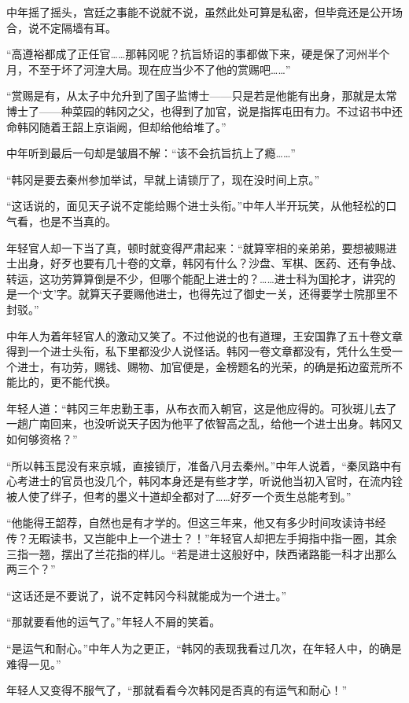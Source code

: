 中年摇了摇头，宫廷之事能不说就不说，虽然此处可算是私密，但毕竟还是公开场合，说不定隔墙有耳。

“高遵裕都成了正任官……那韩冈呢？抗旨矫诏的事都做下来，硬是保了河州半个月，不至于坏了河湟大局。现在应当少不了他的赏赐吧……”

“赏赐是有，从太子中允升到了国子监博士——只是若是他能有出身，那就是太常博士了——种菜园的韩冈之父，也得到了加官，说是指挥屯田有力。不过诏书中还命韩冈随着王韶上京诣阙，但却给他给堆了。”

中年听到最后一句却是皱眉不解：“该不会抗旨抗上了瘾……”

“韩冈是要去秦州参加举试，早就上请锁厅了，现在没时间上京。”

“这话说的，面见天子说不定能给赐个进士头衔。”中年人半开玩笑，从他轻松的口气看，也是不当真的。

年轻官人却一下当了真，顿时就变得严肃起来：“就算宰相的亲弟弟，要想被赐进士出身，好歹也要有几十卷的文章，韩冈有什么？沙盘、军棋、医药、还有争战、转运，这功劳算算倒是不少，但哪个能配上进士的？……进士科为国抡才，讲究的是一个‘文’字。就算天子要赐他进士，也得先过了御史一关，还得要学士院那里不封驳。”

中年人为着年轻官人的激动又笑了。不过他说的也有道理，王安国靠了五十卷文章得到一个进士头衔，私下里都没少人说怪话。韩冈一卷文章都没有，凭什么生受一个进士，有功劳，赐钱、赐物、加官便是，金榜题名的光荣，的确是拓边蛮荒所不能比的，更不能代换。

年轻人道：“韩冈三年忠勤王事，从布衣而入朝官，这是他应得的。可狄斑儿去了一趟广南回来，也没听说天子因为他平了侬智高之乱，给他一个进士出身。韩冈又如何够资格？”

“所以韩玉昆没有来京城，直接锁厅，准备八月去秦州。”中年人说着，“秦凤路中有心考进士的官员也没几个，韩冈本身还是有些才学，听说他当初入官时，在流内铨被人使了绊子，但考的墨义十道却全都对了……好歹一个贡生总能考到。”

“他能得王韶荐，自然也是有才学的。但这三年来，他又有多少时间攻读诗书经传？无暇读书，又岂能中上一个进士？！”年轻官人却把左手拇指中指一圈，其余三指一翘，摆出了兰花指的样儿。“若是进士这般好中，陕西诸路能一科才出那么两三个？”

“这话还是不要说了，说不定韩冈今科就能成为一个进士。”

“那就要看他的运气了。”年轻人不屑的笑着。

“是运气和耐心。”中年人为之更正，“韩冈的表现我看过几次，在年轻人中，的确是难得一见。”

年轻人又变得不服气了，“那就看看今次韩冈是否真的有运气和耐心！”


